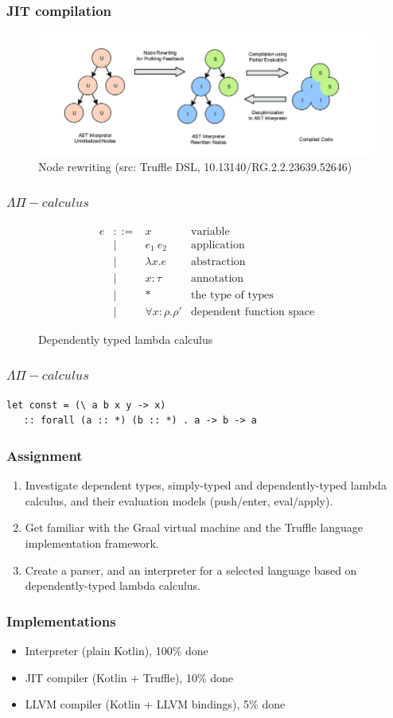 \documentclass[10pt,xcolor=pdflatex,hyperref={unicode}]{beamer}
\begin{document}
\begin{frame}\frametitle{JIT compilation}
\begin{figure}
\centering
\includegraphics[width=.9\linewidth]{./img/node-rewrite.png}
\caption{Node rewriting (src: Truffle DSL, 10.13140/RG.2.2.23639.52646)}
\end{figure}
\end{frame}

\begin{frame}\frametitle{$\Lambda\Pi-calculus$}
  \begin{figure}
    \begin{equation}
\begin{array}{ccll}
e & ::= & x           & \text{variable} \\
  & |   & e_1~e_2      & \text{application} \\
  & |   & \lambda x. e & \text{abstraction} \\
  & |   & x:\tau      & \text{annotation} \\
  & |   & *           & \text{the type of types} \\
  & |   & \forall x:\rho.\rho' & \text{dependent function space}
\end{array}
\end{equation}
  \caption{Dependently typed lambda calculus}
\end{figure}
\end{frame}

\begin{frame}[fragile]\frametitle{$\Lambda\Pi-calculus$}
\begin{verbatim}
let const = (\ a b x y -> x)
   :: forall (a :: *) (b :: *) . a -> b -> a
\end{verbatim}
\end{frame}

\begin{frame}\frametitle{Assignment}
\begin{enumerate}
\item Investigate dependent types, simply-typed and dependently-typed lambda
calculus, and their evaluation models (push/enter, eval/apply).
\item Get familiar with the Graal virtual machine and the Truffle language
implementation framework.
\item Create a parser, and an interpreter for a selected language based on
dependently-typed lambda calculus.
\end{enumerate}
\end{frame}

\begin{frame}\frametitle{Implementations}
  \begin{itemize}
    \item Interpreter (plain Kotlin), 100\% done
    \item JIT compiler (Kotlin + Truffle), 10\% done
    \item LLVM compiler (Kotlin + LLVM bindings), 5\% done
  \end{itemize}
\end{frame}

\end{document}
